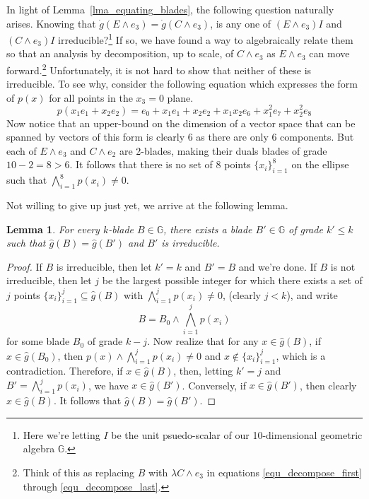 \documentclass{birkjour}
\newtheorem{lem}[thm]{Lemma}
\theoremstyle{definition}
\theoremstyle{remark}
\numberwithin{equation}{section}
\newcommand{\G}{\mathbb{G}}
\newcommand{\gd}{\dot{g}}
\newcommand{\gh}{\hat{g}}
\begin{document}
In light of Lemma~\ref{lma_equating_blades}, the following question naturally arises.
Knowing that $\gd(E\wedge e_3)=\gd(C\wedge e_3)$, is any one of
$(E\wedge e_3)I$ and $(C\wedge e_3)I$ irreducible?\footnote{Here we're letting $I$
be the unit psuedo-scalar of our 10-dimensional geometric algebra $\G$.}  If so, we have found
a way to algebraically relate them so that an analysis by decomposition, up to scale, of $C\wedge e_3$
as $E\wedge e_3$ can move forward.\footnote{Think of this as replacing
$B$ with $\lambda C\wedge e_3$ in equations \eqref{equ_decompose_first} through
\eqref{equ_decompose_last}.}
Unfortunately, it is not hard to show
that neither of these is irreducible.  To see why, consider the following equation which
expresses the form of $p(x)$ for all points in the $x_3=0$ plane.
\begin{equation*}
p(x_1e_1 + x_2e_2) = e_0 + x_1e_1 + x_2e_2 + x_1x_2e_6 + x_1^2e_7 + x_2^2e_8
\end{equation*}
Now notice that an upper-bound on the dimension of a vector space that can
be spanned by vectors of this form is clearly 6 as there are only 6 components.
But each of $E\wedge e_3$ and $C\wedge e_2$ are 2-blades, making their
duals blades of grade $10-2=8>6$.  It follows that there is no set of 8 points $\{x_i\}_{i=1}^8$
on the ellipse such that $\bigwedge_{i=1}^8 p(x_i)\neq 0$.

Not willing to give up just yet, we arrive at the following lemma.

\begin{lem}
For every $k$-blade $B\in\G$, there exists a blade $B'\in\G$ of grade $k'\leq k$
such that $\gh(B)=\gh(B')$ and $B'$ is irreducible.
\end{lem}
\begin{proof}
If $B$ is irreducible, then let $k'=k$ and $B'=B$ and we're done.
If $B$ is not irreducible, then let $j$ be the largest possible integer
for which there exists a set of $j$ points $\{x_i\}_{i=1}^j\subseteq\gh(B)$
with $\bigwedge_{i=1}^j p(x_i)\neq 0$, (clearly $j<k$), and write
\begin{equation*}
B = B_0\wedge\bigwedge_{i=1}^j p(x_i)
\end{equation*}
for some blade $B_0$ of grade $k-j$.  Now realize that for any $x\in\gh(B)$,
if $x\in\gh(B_0)$, then $p(x)\wedge\bigwedge_{i=1}^j p(x_i)\neq 0$ and $x\not\in\{x_i\}_{i=1}^j$,
which is a contradiction.  Therefore, if $x\in\gh(B)$, then, letting $k'=j$ and $B'=\bigwedge_{i=1}^jp(x_i)$,
we have $x\in\gh(B')$.  Conversely, if $x\in\gh(B')$, then clearly $x\in\gh(B)$.  It follows that
$\gh(B)=\gh(B')$.
\end{proof}
\end{document}
